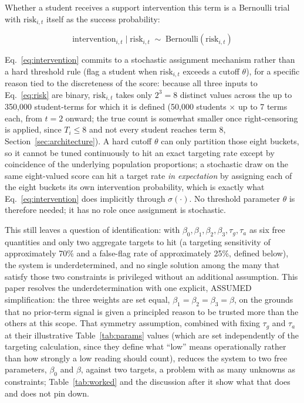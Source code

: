 \documentclass[11pt]{article}
\begin{document}
Whether a student receives a support intervention this term is a Bernoulli trial with $\text{risk}_{i,t}$ itself as the success probability:

\begin{equation}
\text{intervention}_{i,t} \mid \text{risk}_{i,t} \;\sim\; \text{Bernoulli}\!\left(\text{risk}_{i,t}\right)
\label{eq:intervention}
\end{equation}

Eq.~\ref{eq:intervention} commits to a stochastic assignment mechanism rather than a hard threshold rule (flag a student when $\text{risk}_{i,t}$ exceeds a cutoff $\theta$), for a specific reason tied to the discreteness of the score: because all three inputs to Eq.~\ref{eq:risk} are binary, $\text{risk}_{i,t}$ takes only $2^3=8$ distinct values across the up to 350,000 student-terms for which it is defined (50,000 students $\times$ up to 7 terms each, from $t=2$ onward; the true count is somewhat smaller once right-censoring is applied, since $T_i \le 8$ and not every student reaches term 8, Section~\ref{sec:architecture}). A hard cutoff $\theta$ can only partition those eight buckets, so it cannot be tuned continuously to hit an exact targeting rate except by coincidence of the underlying population proportions; a stochastic draw on the same eight-valued score can hit a target rate \emph{in expectation} by assigning each of the eight buckets its own intervention probability, which is exactly what Eq.~\ref{eq:intervention} does implicitly through $\sigma(\cdot)$. No threshold parameter $\theta$ is therefore needed; it has no role once assignment is stochastic.

This still leaves a question of identification: with $\beta_0,\beta_1,\beta_2,\beta_3,\tau_g,\tau_a$ as six free quantities and only two aggregate targets to hit (a targeting sensitivity of approximately 70\% and a false-flag rate of approximately 25\%, defined below), the system is underdetermined, and no single solution among the many that satisfy those two constraints is privileged without an additional assumption. This paper resolves the underdetermination with one explicit, ASSUMED simplification: the three weights are set equal, $\beta_1=\beta_2=\beta_3=\beta$, on the grounds that no prior-term signal is given a principled reason to be trusted more than the others at this scope. That symmetry assumption, combined with fixing $\tau_g$ and $\tau_a$ at their illustrative Table~\ref{tab:params} values (which are set independently of the targeting calculation, since they define what ``low'' means operationally rather than how strongly a low reading should count), reduces the system to two free parameters, $\beta_0$ and $\beta$, against two targets, a problem with as many unknowns as constraints; Table~\ref{tab:worked} and the discussion after it show what that does and does not pin down.
\end{document}
